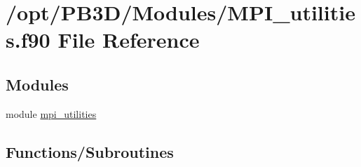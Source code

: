 \hypertarget{MPI__utilities_8f90}{}\section{/opt/\+P\+B3\+D/\+Modules/\+M\+P\+I\+\_\+utilities.f90 File Reference}
\label{MPI__utilities_8f90}
\subsection*{Modules}
\begin{DoxyCompactItemize}
\item 
module \hyperlink{namespacempi__utilities}{mpi\+\_\+utilities}
\end{DoxyCompactItemize}
\subsection*{Functions/\+Subroutines}
